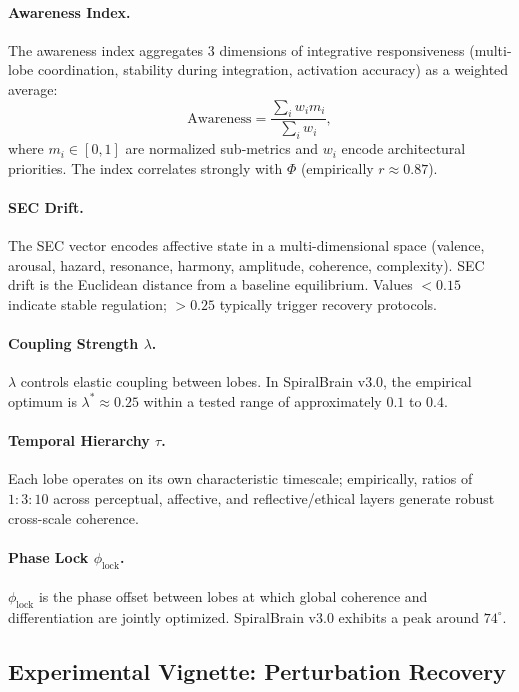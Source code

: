 \documentclass[11pt,a4paper]{article}
\begin{document}
\paragraph{Awareness Index.}
The awareness index aggregates 3 dimensions of integrative responsiveness (multi-lobe coordination, stability during integration, activation accuracy) as a weighted average:
\[
\text{Awareness} = \frac{\sum_i w_i m_i}{\sum_i w_i},
\]
where \( m_i \in [0,1] \) are normalized sub-metrics and \( w_i \) encode architectural priorities. The index correlates strongly with \( \Phi \) (empirically \( r \approx 0.87 \)).

\paragraph{SEC Drift.}
The SEC vector encodes affective state in a multi-dimensional space (valence, arousal, hazard, resonance, harmony, amplitude, coherence, complexity). SEC drift is the Euclidean distance from a baseline equilibrium. Values \( < 0.15 \) indicate stable regulation; \( > 0.25 \) typically trigger recovery protocols.

\paragraph{Coupling Strength \( \lambda \).}
\( \lambda \) controls elastic coupling between lobes. In SpiralBrain v3.0, the empirical optimum is \( \lambda^{*} \approx 0.25 \) within a tested range of approximately \( 0.1 \) to \( 0.4 \).

\paragraph{Temporal Hierarchy \( \tau \).}
Each lobe operates on its own characteristic timescale; empirically, ratios of \( 1:3:10 \) across perceptual, affective, and reflective/ethical layers generate robust cross-scale coherence.

\paragraph{Phase Lock \( \phi_{\text{lock}} \).}
\( \phi_{\text{lock}} \) is the phase offset between lobes at which global coherence and differentiation are jointly optimized. SpiralBrain v3.0 exhibits a peak around \( 74^\circ \).

\subsection{Experimental Vignette: Perturbation Recovery}
\end{document}
